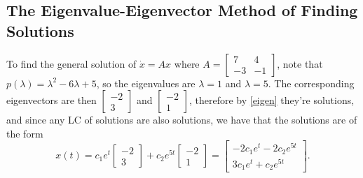 \subsection{The Eigenvalue-Eigenvector Method of Finding Solutions}
\begin{example}
    To find the general solution of $\dot x =Ax$ where $A=
    \begin{bmatrix}
        7 & 4\\
        -3 & -1
    \end{bmatrix}$, note that $p(\lambda)=\lambda^2-6\lambda+5$, so the eigenvalues are $\lambda=1$ and $\lambda=5$. The corresponding eigenvectors are then $
    \begin{bmatrix}
       -2\\
       3
    \end{bmatrix}$ and $
    \begin{bmatrix}
        -2\\
        1
    \end{bmatrix}$, therefore by \cref{eigen} they're solutions, and since any LC of solutions are also solutions, we have that the solutions are of the form \[
    x(t)=c_1e^{t}
    \begin{bmatrix}
        -2\\
        3
    \end{bmatrix}+c_2e^{5t}
    \begin{bmatrix}
        -2\\
        1
    \end{bmatrix}=
    \begin{bmatrix}
        -2c_1e^{t}-2c_2e^{5t}\\
        3c_1e^{t}+c_2e^{5t}
    \end{bmatrix}.
    \] 
\end{example} 

